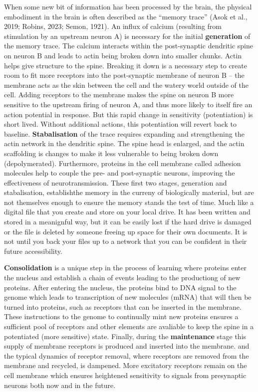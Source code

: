\documentclass[
  letterpaper,
  DIV=11,
  numbers=noendperiod,
  oneside]{scrartcl}
\begin{document}
When some new bit of information has been processed by the brain, the
physical embodiment in the brain is often described as the ``memory
trace'' (Asok et al., 2019; Robins, 2023; Semon, 1921). An influx of
calcium (resulting from stimulation by an upstream neuron A) is
necessary for the initial \textbf{generation} of the memory trace. The
calcium interacts within the post-synaptic dendritic spine on neuron B
and leads to actin being broken down into smaller chunks. Actin helps
give structure to the spine. Breaking it down is a necessary step to
create room to fit more receptors into the post-synaptic membrane of
neuron B -- the membrane acts as the skin between the cell and the
watery world outside of the cell. Adding receptors to the membrane makes
the spine on neuron B more sensitive to the upstream firing of neuron A,
and thus more likely to itself fire an action potential in response. But
this rapid change in sensitivity (potentiation) is short lived. Without
additional actions, this potentiation will revert back to baseline.
\textbf{Stabalisation} of the trace requires expanding and strengthening
the actin network in the dendritic spine. The spine head is enlarged,
and the actin scaffolding is changes to make it less vulnerable to being
broken down (depolymerated). Furthermore, proteins in the cell membrane
called adhesion molecules help to couple the pre- and post-synaptic
neurons, improving the effectiveness of neurotransmission. These first
two stages, generation and stabalisation, establishthe memory in the
curreny of biologically material, but are not themselves enough to
ensure the memory stands the test of time. Much like a digital file that
you create and store on your local drive. It has been written and stored
in a meanignful way, but it can be easily lost if the hard drive is
damaged or the file is deleted by someone freeing up space for their own
documents. It is not until you back your files up to a network that you
can be confident in their future accessibility.

\textbf{Consolidation} is a unique step in the process of learning where
proteins enter the nucleus and establish a chain of events leading to
the productiong of new proteins. After entering the nucleus, the
proteins bind to DNA signal to the genome which leads to transcription
of new molecules (mRNA) that will then be turned into proteins, such as
receptors that can be inserted in the membrane. These instructions to
the genome to continually mint new proteins ensures a sufficient pool of
receptors and other elements are avaliable to keep the spine in a
potentiated (more sensitive) state. Finally, during the
\textbf{maintenance} stage this supply of membrane receptors is produced
and inserted into the membrane. and the typical dynamics of receptor
removal, where receptors are removed from the membrane and recycled, is
dampened. More excitatory receptors remain on the cell membrane which
ensures heightened sensitivity to signals from presynaptic neurons both
now and in the future.
\end{document}
